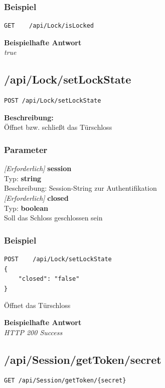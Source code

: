 \subsubsection{Beispiel}
\begin{lstlisting}
GET    /api/Lock/isLocked

\end{lstlisting}
\textbf{Beispielhafte Antwort} \\
\textit{true}





\subsection{/api/Lock/setLockState}
\begin{lstlisting}
POST /api/Lock/setLockState
\end{lstlisting}

\textbf{Beschreibung:} \\
Öffnet bzw. schließt das Türschloss 

\subsubsection{Parameter}
\textit{[Erforderlich]} \textbf{session} \\
Typ: \textbf{string} \\
Beschreibung: Session-String zur Authentifikation\\

\textit{[Erforderlich]} \textbf{closed} \\
Typ: \textbf{boolean} \\
Soll das Schloss geschlossen sein

\subsubsection{Beispiel}
\begin{lstlisting}
POST    /api/Lock/setLockState
{
    "closed": "false"
}
\end{lstlisting}
Öffnet das Türschloss

\textbf{Beispielhafte Antwort} \\
\textit{HTTP 200 Success}





\subsection{/api/Session/getToken/{secret}}
\begin{lstlisting}
GET /api/Session/getToken/{secret}
\end{lstlisting}

